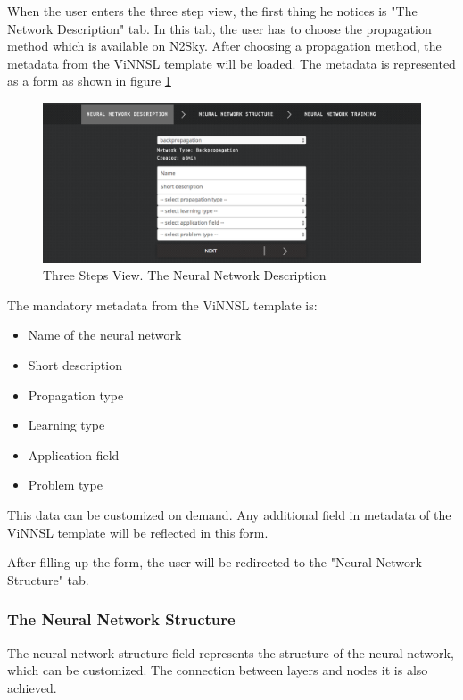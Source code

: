 When the user enters the three step view, the first thing he notices is "The Network Description" tab. In this tab, the user has to choose the propagation method which is available on N2Sky. After choosing a propagation method, the metadata from the ViNNSL template will be loaded. The metadata is represented as a form as shown in figure \ref{fig:nn_desc_3_steps}

\begin{figure}[H]
\begin{center}
  \includegraphics[width=\linewidth]{components/5/img/nn_desc_3_steps.png}
  \caption{Three Steps View. The Neural Network Description}
  \label{fig:nn_desc_3_steps}
\end{center}
\end{figure}

The mandatory metadata from the ViNNSL template is:
\begin{itemize}
\item Name of the neural network
\item Short description
\item Propagation type
\item Learning type
\item Application field
\item Problem type
\end{itemize}

This data can be customized on demand. Any additional field in metadata of the ViNNSL template will be reflected in this form.


After filling up the form, the user will be redirected to the "Neural Network Structure" tab.

\subsubsection{The Neural Network Structure}

The neural network structure field represents the structure of the neural network, which can be customized. The connection between layers and nodes it is also achieved. 

